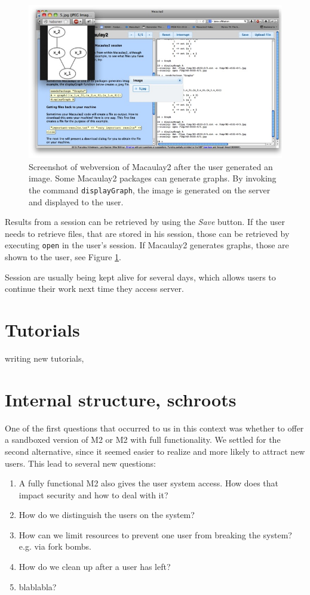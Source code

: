 \documentclass[]{article}
\begin{document}
\begin{figure}[htb]
    \includegraphics[width=.95\textwidth]{withGraph.jpg}
    \caption{Screenshot of webversion of Macaulay2 after the user generated an image. Some Macaulay2 packages can generate graphs. By invoking the command {\tt displayGraph}, the image is generated on the server and displayed to the user.}
    \label{fig:graph}
\end{figure}

Results from a session can be retrieved by using the {\it Save} button. If the user needs to retrieve files, that are stored in his session, those can be retrieved by executing {\tt open} in the user's session. If Macaulay2 generates graphs, those are shown to the user, see Figure \ref{fig:graph}.

Session are usually being kept alive for several days, which allows users to continue their work next time they access server. 


\section{Tutorials}
writing new tutorials,
\section{Internal structure, schroots}

One of the first questions that occurred to us in this context was whether to offer a sandboxed version of M2 or M2 with full functionality.
We settled for the second alternative, since it seemed easier to realize and more likely to attract new users.
This lead to several new questions:
\begin{enumerate}
\item A fully functional M2 also gives the user system access. How does that impact security and how to deal with it?
\item How do we distinguish the users on the system?
\item How can we limit resources to prevent one user from breaking the system? e.g. via fork bombs.
\item How do we clean up after a user has left?
\item blablabla?
\end{enumerate}
\end{document}
